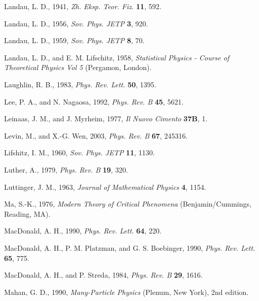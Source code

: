 \begin{list}{}{\setlength{\leftmargin}{2em}\setlength{\itemindent}{-2em}}
\item Landau, L. D., 1941, \emph{Zh. Eksp. Teor. Fiz.} \textbf{11}, 592.
\item Landau, L. D., 1956, \emph{Sov. Phys. JETP} \textbf{3}, 920.
\item Landau, L. D., 1959, \emph{Sov. Phys. JETP} \textbf{8}, 70.
\item Landau, L. D., and E. M. Lifschitz, 1958, \emph{Statistical Physics - Course of Theoretical Physics Vol 5} (Pergamon, London).
\item Laughlin, R. B., 1983, \emph{Phys. Rev. Lett.} \textbf{50}, 1395.
\item Lee, P. A., and N. Nagaosa, 1992, \emph{Phys. Rev. B} \textbf{45}, 5621.
\item Leinaas, J. M., and J. Myrheim, 1977, \emph{Il Nuovo Cimento} \textbf{37B}, 1.
\item Levin, M., and X.-G. Wen, 2003, \emph{Phys. Rev. B} \textbf{67}, 245316.
\item Lifshitz, I. M., 1960, \emph{Sov. Phys. JETP} \textbf{11}, 1130.
\item Luther, A., 1979, \emph{Phys. Rev. B} \textbf{19}, 320.
\item Luttinger, J. M., 1963, \emph{Journal of Mathematical Physics} \textbf{4}, 1154.
\item Ma, S.-K., 1976, \emph{Modern Theory of Critical Phenomena} (Benjamin/Cummings, Reading, MA).
\item MacDonald, A. H., 1990, \emph{Phys. Rev. Lett.} \textbf{64}, 220.
\item MacDonald, A. H., P. M. Platzman, and G. S. Boebinger, 1990, \emph{Phys. Rev. Lett.} \textbf{65}, 775.
\item MacDonald, A. H., and P. Streda, 1984, \emph{Phys. Rev. B} \textbf{29}, 1616.
\item Mahan, G. D., 1990, \emph{Many-Particle Physics} (Plenum, New York), 2nd edition.


\end{list}
